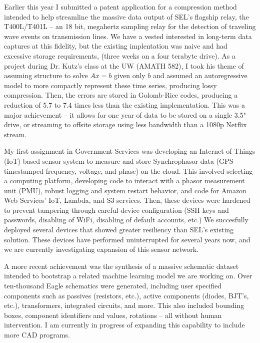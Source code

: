 \documentclass[letterpaper]{article}
\begin{document}
Earlier this year I submitted a patent application for a compression method intended
to help streamline the massive data output of SEL's flagship relay, the T400L/T401L -- an
18 bit, megahertz sampling relay for the detection of traveling wave events on
transmission lines. We have a vested interested in long-term data captures at this
fidelity, but the existing implentation was naive and had excessive storage requirements,
(three weeks on a four terabyte drive). As a project during Dr. Kutz's class at the UW
(AMATH 582), I took his theme of assuming structure to solve $Ax=b$ given only $b$ and
assumed an autoregressive model to more compactly represent these time series,
producing lossy compression. Then, the errors are stored in Golomb-Rice codes, producing
a reduction of 5.7 to 7.4 times less than the existing implementation. This was a
major achievement -- it allows for one year of data to be stored on a single 3.5"
drive, or streaming to offsite storage using less bandwidth than a 1080p Netflix stream.

My first assignment in Government Services was developing an Internet
of Things (IoT) based sensor system to measure and store Synchrophasor data (GPS timestamped
frequency, voltage, and phase) on the cloud. This involved selecting a computing platform,
developing code to interact with a phasor measurement unit (PMU), robust logging and
system restart behavior, and code for Amazon Web Services' IoT, Lambda, and S3
services. Then, these devices were hardened to prevent tampering through
careful device configuration (SSH keys and passwords, disabling of WiFi, disabling
of default accounts, etc.) We succesfully deployed several devices that showed greater
resiliency than SEL's existing solution. These devices have performed uninterrupted for
several years now, and we are currently investigating expansion of this sensor network.


A more recent achievement was the synthesis of a massive schematic dataset intended to
bootstrap a related machine learning model we are working on. Over ten-thousand Eagle
schematics were generated, including user specified components such as passives
(resistors, etc.), active components (diodes, BJT's, etc.), transformers, integrated
circuits, and more. This also included bounding boxes, component identifiers and values,
rotations -- all without human intervention. I am currently in progress of expanding
this capability to include more CAD programs.
\end{document}
